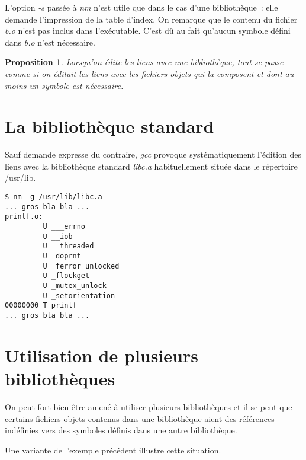 \documentclass{article}
\newtheorem{proposition}{Proposition}
\begin{document}
L'option \emph{-s} pass{\'e}e {\`a} {\em nm} n'est utile que dans le cas
d'une biblioth{\`e}que~: elle demande l'impression de la table d'index.
On remarque que le contenu du fichier {\em b.o} n'est pas inclus dans
l'ex{\'e}cutable. C'est d{\^u} au fait qu'aucun symbole d{\'e}fini dans {\em b.o}
n'est n{\'e}cessaire.

\begin{proposition}
Lorsqu'on {\'e}dite les liens avec une biblioth{\`e}que, tout se passe comme
si on {\'e}ditait les liens avec les fichiers objets qui la composent
et dont au moins un symbole est n{\'e}cessaire.
\end{proposition}

\section{La biblioth{\`e}que standard}

Sauf demande expresse du contraire, {\em gcc} provoque syst{\'e}matiquement
l'{\'e}dition des liens avec la biblioth{\`e}que standard {\em libc.a}
habituellement situ{\'e}e dans le r{\'e}pertoire /usr/lib.

\begin{verbatim}
$ nm -g /usr/lib/libc.a
... gros bla bla ...
printf.o:
         U ___errno
         U __iob
         U __threaded
         U _doprnt
         U _ferror_unlocked
         U _flockget
         U _mutex_unlock
         U _setorientation
00000000 T printf
... gros bla bla ...
\end{verbatim}

\section{Utilisation de plusieurs biblioth{\`e}ques}

On peut fort bien {\^e}tre amen{\'e} {\`a} utiliser plusieurs biblioth{\`e}ques et
il se peut que certains fichiers objets contenus dans une biblioth{\`e}que
aient des r{\'e}f{\'e}rences ind{\'e}finies vers des symboles d{\'e}finis dans une
autre biblioth{\`e}que.

Une variante de l'exemple pr{\'e}c{\'e}dent illustre cette situation.
\end{document}
